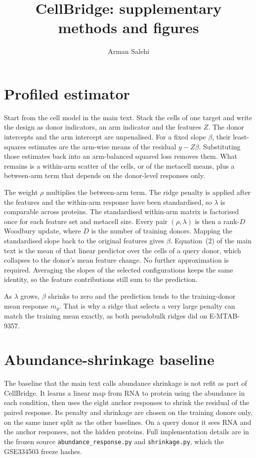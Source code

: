 \documentclass[10pt,a4paper]{article}
\title{\bfseries CellBridge: supplementary methods and figures}
\author{Arman Salehi}
\date{}
\begin{document}
\maketitle

\section{Profiled estimator}
Start from the cell model in the main text. Stack the cells of one target and write the design as donor indicators, an arm indicator and the features \(Z\). The donor intercepts and the arm intercept are unpenalised. For a fixed slope \(\beta\), their least-squares estimates are the arm-wise means of the residual \(y-Z\beta\). Substituting those estimates back into an arm-balanced squared loss removes them. What remains is a within-arm scatter of the cells, or of the metacell means, plus a between-arm term that depends on the donor-level responses only.

The weight \(\rho\) multiplies the between-arm term. The ridge penalty is applied after the features and the within-arm response have been standardised, so \(\lambda\) is comparable across proteins. The standardised within-arm matrix is factorised once for each feature set and metacell size. Every pair \((\rho,\lambda)\) is then a rank-\(D\) Woodbury update, where \(D\) is the number of training donors. Mapping the standardised slope back to the original features gives \(\beta\). Equation~(2) of the main text is the mean of that linear predictor over the cells of a query donor, which collapses to the donor's mean feature change. No further approximation is required. Averaging the slopes of the selected configurations keeps the same identity, so the feature contributions still sum to the prediction.

As \(\lambda\) grows, \(\beta\) shrinks to zero and the prediction tends to the training-donor mean response \(m_y\). That is why a ridge that selects a very large penalty can match the training mean exactly, as both pseudobulk ridges did on E-MTAB-9357.

\section{Abundance-shrinkage baseline}
The baseline that the main text calls abundance shrinkage is not refit as part of CellBridge. It learns a linear map from RNA to protein using the abundance in each condition, then uses the eight anchor responses to shrink the residual of the paired response. Its penalty and shrinkage are chosen on the training donors only, on the same inner split as the other baselines. On a query donor it sees RNA and the anchor responses, not the hidden proteins. Full implementation details are in the frozen source \texttt{abundance\_response.py} and \texttt{shrinkage.py}, which the GSE334503 freeze hashes.
\end{document}
